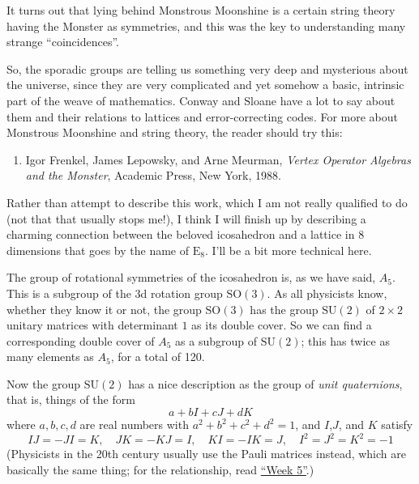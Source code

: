 \documentclass[12pt]{article}
\def\tightlist{}
\begin{document}
It turns out that lying behind Monstrous Moonshine is a certain string
theory having the Monster as symmetries, and this was the key to
understanding many strange ``coincidences''.

So, the sporadic groups are telling us something very deep and
mysterious about the universe, since they are very complicated and yet
somehow a basic, intrinsic part of the weave of mathematics. Conway and
Sloane have a lot to say about them and their relations to lattices and
error-correcting codes. For more about Monstrous Moonshine and string
theory, the reader should try this:

\begin{enumerate}
\def\labelenumi{\arabic{enumi})}
\setcounter{enumi}{1}
\tightlist
\item
  Igor Frenkel, James Lepowsky, and Arne Meurman, \emph{Vertex Operator
  Algebras and the Monster}, Academic Press, New York, 1988.
\end{enumerate}

Rather than attempt to describe this work, which I am not really
qualified to do (not that that usually stops me!), I think I will finish
up by describing a charming connection between the beloved icosahedron
and a lattice in 8 dimensions that goes by the name of \(\mathrm{E}_8\).
I'll be a bit more technical here.

The group of rotational symmetries of the icosahedron is, as we have
said, \(A_5\). This is a subgroup of the 3d rotation group
\(\mathrm{SO}(3)\). As all physicists know, whether they know it or not,
the group \(\mathrm{SO}(3)\) has the group \(\mathrm{SU}(2)\) of
\(2\times2\) unitary matrices with determinant \(1\) as its double
cover. So we can find a corresponding double cover of \(A_5\) as a
subgroup of \(\mathrm{SU}(2)\); this has twice as many elements as
\(A_5\), for a total of 120.

Now the group \(\mathrm{SU}(2)\) has a nice description as the group of
\emph{unit quaternions}, that is, things of the form
\[a + bI + cJ + dK\] where \(a,b,c,d\) are real numbers with
\(a^2 + b^2 + c^2 + d^2 = 1\), and \(I\),\(J\), and \(K\) satisfy
\[IJ = -JI = K, \quad JK = -KJ = I, \quad KI = -IK = J, \quad I^2 = J^2 = K^2 = -1\]
(Physicists in the 20th century usually use the Pauli matrices instead,
which are basically the same thing; for the relationship, read
\protect\hyperlink{week5}{``Week 5''}.)
\end{document}

